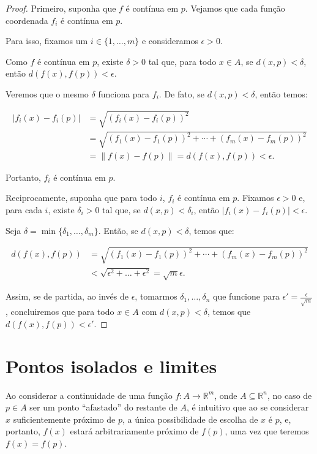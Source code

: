 \begin{proof}
    Primeiro, suponha que $f$ é contínua em $p$.
    Vejamos que cada função coordenada $f_i$ é contínua em $p$.
    
    Para isso, fixamos um $i \in \{1, \dots, m\}$ e consideramos $\epsilon>0$.

    Como $f$ é contínua em $p$, existe $\delta>0$ tal que, para todo $x \in A$, se $d(x, p) < \delta$, então $d(f(x), f(p)) < \epsilon$.

    Veremos que o mesmo $\delta$ funciona para $f_i$.
    De fato, se $d(x, p) < \delta$, então temos:

    \begin{align*}
        |f_i(x) - f_i(p)| &= \sqrt{(f_i(x) - f_i(p))^2} \\
        &= \sqrt{(f_1(x) - f_1(p))^2 + \cdots + (f_m(x) - f_m(p))^2} \\
        &= \|f(x) - f(p)\| = d(f(x), f(p)) < \epsilon.
    \end{align*}

    Portanto, $f_i$ é contínua em $p$.

    Reciprocamente, suponha que para todo $i$, $f_i$ é contínua em $p$.
    Fixamos $\epsilon>0$ e, para cada $i$, existe $\delta_i>0$ tal que, se $d(x, p) < \delta_i$, então $|f_i(x) - f_i(p)| < \epsilon$.

    Seja $\delta = \min\{\delta_1, \ldots, \delta_m\}$. Então, se $d(x, p) < \delta$, temos que:

    \begin{align*}
        d(f(x), f(p)) &= \sqrt{(f_1(x) - f_1(p))^2 + \cdots + (f_m(x) - f_m(p))^2} \\
        &< \sqrt{\epsilon^2+\dots+\epsilon^2}= \sqrt{m}\epsilon.
    \end{align*}

    Assim, se de partida, ao invés de $\epsilon$, tomarmos $\delta_1, \dots, \delta_n$ que funcione para $\epsilon'=\frac{\epsilon}{\sqrt{m}}$, concluiremos que para todo $x \in A$ com $d(x, p) < \delta$, temos que $d(f(x), f(p)) < \epsilon'$.
\end{proof}

\section{Pontos isolados e limites}
Ao considerar a continuidade de uma função $f: A \to \mathbb R^m$, onde $A\subseteq \mathbb R^n$, no caso de $p \in A$ ser um ponto ``afastado'' do restante de $A$, é intuitivo que ao se considerar $x$ suficientemente próximo de $p$, a única possibilidade de escolha de $x$ é $p$, e, portanto, $f(x)$ estará arbitrariamente próximo de $f(p)$, uma vez que teremos $f(x)=f(p)$.

